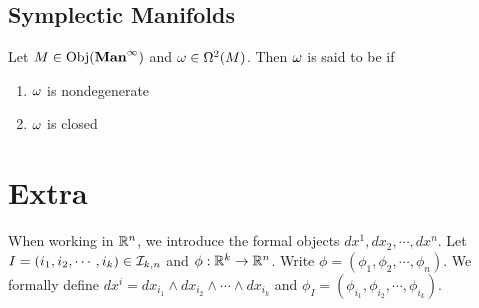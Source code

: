 \documentclass{book}
\begin{document}
	
	
	
	
	
	
	
	
	\newpage
	\section{Symplectic Manifolds}
	
	\begin{defn}
		Let $M \in \operatorname{Obj}(\operatorname*{\text{\textbf{Man}}^{\infty}})$ and $\omega \in \Omega^2(M)$. Then $\omega$ is said to be  if 
		\begin{enumerate}
			\item $\omega$ is nondegenerate
			\item $\omega$ is closed
		\end{enumerate} 
	\end{defn}
	
	
	
	
	
	
	
	
	
	
	
	
	
	
	
	
	
	
	
	
	
	
	
	
	
	
	
	
	
	
	




	
	
	
	
	
	
	
	
	
	
	
	
	
	
	
	
	
	
	
	
	\newpage 
	\chapter{Extra}
	\begin{defn}
		When working in $\mathbb{R}^n$, we introduce the formal objects $dx^1, dx_2, \cdots, dx^n$. Let $I = (i_1, i_2, \cdots, i_k)\in \mathcal{I}_{k,n}$ and $\phi: \mathbb{R}^k \rightarrow \mathbb{R}^n$. Write $\phi = (\phi_1, \phi_2, \cdots, \phi_n)$. We formally define $dx^i = dx_{i_1}\wedge dx_{i_2} \wedge \cdots \wedge dx_{i_k}$ and $\phi_I = (\phi_{i_1}, \phi_{i_2}, \cdots, \phi_{i_k})$.   
	\end{defn}
	
\end{document}
